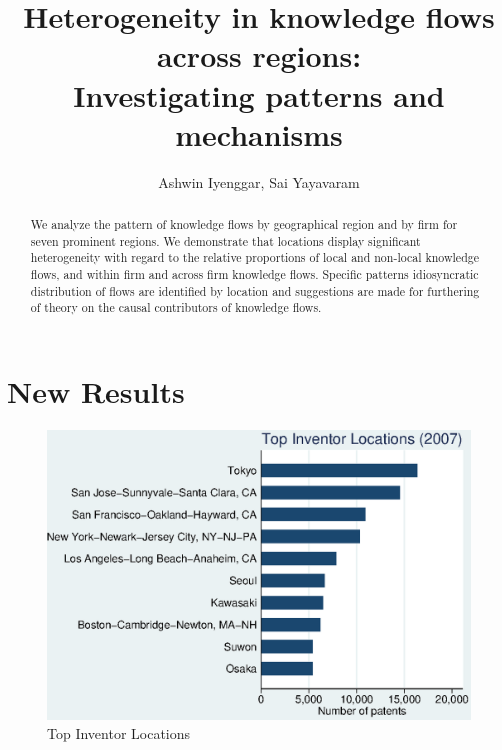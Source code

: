 \documentclass[12pt]{article}
\begin{document}
\title{Heterogeneity in knowledge flows across regions:\\  Investigating patterns and mechanisms}
\author{Ashwin Iyenggar, Sai Yayavaram} 

\maketitle
\thispagestyle{empty}

\begin{abstract}
\noindent We analyze the pattern of knowledge flows by geographical region and by firm for seven prominent regions. We demonstrate that locations display significant heterogeneity with regard to the relative proportions of local and non-local knowledge flows, and within firm and across firm knowledge flows. Specific patterns idiosyncratic distribution of flows are identified by location and suggestions are made for furthering of theory on the causal contributors of knowledge flows.
\end{abstract}

\doublespacing

\newpage

\section{New Results}



\begin{figure}[h]
\begin{centering}
  \includegraphics{2007top10}
  \caption{Top Inventor Locations}
  \label{fig:2007top10}
\end{centering}
\end{figure}
\end{document}

